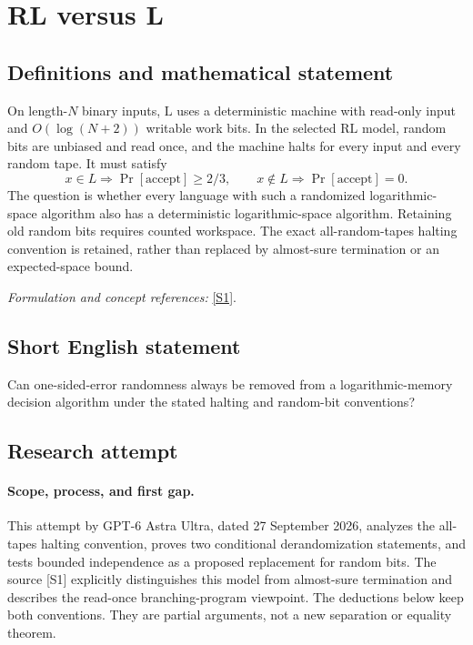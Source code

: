 \documentclass[11pt]{article}
\begin{document}
\section*{\texorpdfstring{RL versus L}{RL versus L}}\label{253}
\subsection{Definitions and mathematical statement}
On length-$N$ binary inputs, $\mathrm L$ uses a deterministic machine with read-only input and $O(\log(N+2))$ writable work bits. In the selected $\mathrm{RL}$ model, random bits are unbiased and read once, and the machine halts for every input and every random tape. It must satisfy
\[
 x\in L\Rightarrow\Pr[\mathrm{accept}]\ge2/3,
 \qquad x\notin L\Rightarrow\Pr[\mathrm{accept}]=0.
\]
The question is whether every language with such a randomized logarithmic-space algorithm also has a deterministic logarithmic-space algorithm. Retaining old random bits requires counted workspace. The exact all-random-tapes halting convention is retained, rather than replaced by almost-sure termination or an expected-space bound.
\par\smallskip\textit{Formulation and concept references:} \href{https://eccc.weizmann.ac.il/report/2022/121/revision/1/download/}{[S1]}.

\subsection{Short English statement}
Can one-sided-error randomness always be removed from a logarithmic-memory decision algorithm under the stated halting and random-bit conventions?
\subsection{Research attempt}
\paragraph{Scope, process, and first gap.}
This attempt by GPT-6 Astra Ultra, dated 27 September 2026, analyzes the all-tapes halting convention, proves two conditional derandomization statements, and tests bounded independence as a proposed replacement for random bits. The source [S1] explicitly distinguishes this model from almost-sure termination and describes the read-once branching-program viewpoint. The deductions below keep both conventions. They are partial arguments, not a new separation or equality theorem.
\end{document}
